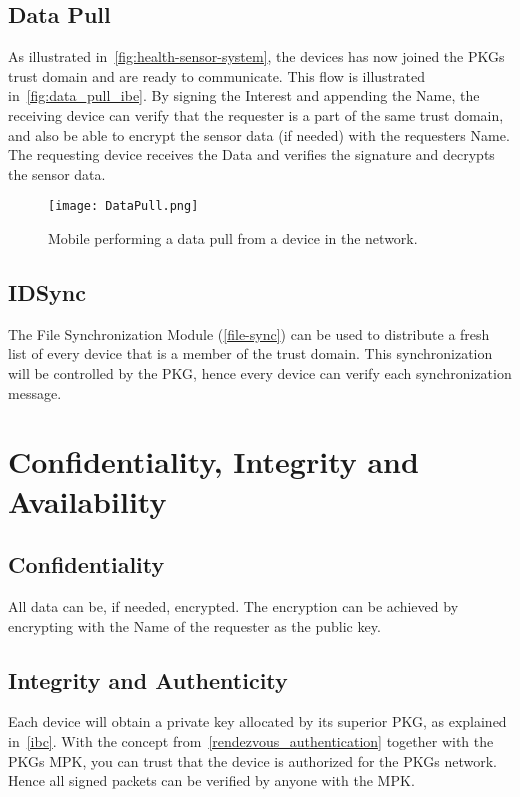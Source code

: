 \subsection{Data Pull}
As illustrated in~\autoref{fig:health-sensor-system}, the devices has now joined the \gls{PKG}s trust domain and are ready to communicate.
This flow is illustrated in~\autoref{fig:data_pull_ibe}.
By signing the Interest and appending the Name, the receiving device can verify that the requester is a part of the same trust domain, and also be able to encrypt the sensor data (if needed) with the requesters Name.
The requesting device receives the Data and verifies the signature and decrypts the sensor data.

\begin{figure}[ht]
  \centering
  \texttt{[image: DataPull.png]}
  \caption{Mobile performing a data pull from a device in the network.}
  \label{fig:data_pull_ibe}
\end{figure}

\subsection{IDSync}
The File Synchronization Module (\autoref{file-sync}) can be used to distribute a fresh list of every device that is a member of the trust domain.
This synchronization will be controlled by the \gls{PKG}, hence every device can verify each synchronization message.

\section{Confidentiality, Integrity and Availability}
\subsection{Confidentiality}

All data can be, if needed, encrypted.
The encryption can be achieved by encrypting with the Name of the requester as the public key.


\subsection{Integrity and Authenticity}

Each device will obtain a private key allocated by its superior \gls{PKG}, as explained in~\autoref{ibc}.
With the concept from~\autoref{rendezvous_authentication} together with the \gls{PKG}s \gls{MPK}, you can trust that the device is authorized for the \gls{PKG}s network. Hence all signed packets can be verified by anyone with the \gls{MPK}.

